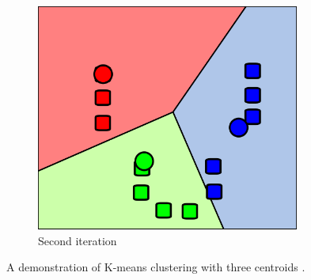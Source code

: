 \documentclass{report}
\begin{document}
\begin{figure}
    \begin{subfigure}{0.3\textwidth}
        \includegraphics[width=0.95\textwidth]{kmean3.png}
        \caption{Second iteration}
    \end{subfigure}
    \caption{A demonstration of K-means clustering with three centroids \cite{kmeanspic}.}
    \label{fig:kmeans}
\end{figure}
\end{document}
